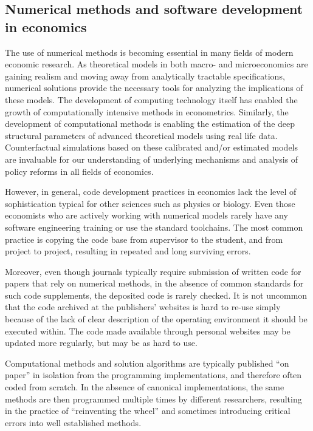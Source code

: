 
\subsection{Numerical methods and software development in economics}

The use of numerical methods is becoming essential in many fields of modern economic research.
As theoretical models in both macro- and microeconomics are gaining realism and moving away from
analytically tractable specifications, numerical solutions provide the necessary tools for 
analyzing the implications of these models.
The development of computing technology itself has enabled the growth of computationally intensive
methods in econometrics.
Similarly, the development of computational methods is enabling the estimation of the deep 
structural parameters of advanced theoretical models using real life data.
Counterfactual simulations based on these calibrated and/or estimated models are 
invaluable for our understanding of underlying mechanisms and analysis of 
policy reforms in all fields of economics.

However, in general, code development practices in economics lack the level of
sophistication typical for other sciences such as physics or biology.  Even
those economists who are actively working with numerical models rarely have
any software engineering training or use the standard toolchains.  The most
common practice is copying the code base from supervisor to the student, and
from project to project, resulting in repeated and long surviving errors.

Moreover, even though journals typically require submission of written code for 
papers that rely on numerical methods, in the absence of common standards for such 
code supplements, the deposited code is rarely checked.  It is not uncommon that the
code archived at the publishers' websites is hard to re-use simply because of the lack
of clear description of the operating environment it should be executed within.
The code made available through personal websites may be updated more regularly, 
but may be as hard to use.

Computational methods and solution algorithms are typically published ``on
paper'' in isolation from the programming implementations, and therefore often
coded from scratch.  In the absence of canonical implementations, the same
methods are then programmed multiple times by different researchers, resulting
in the practice of ``reinventing the wheel'' and sometimes introducing
critical errors into well established methods.

